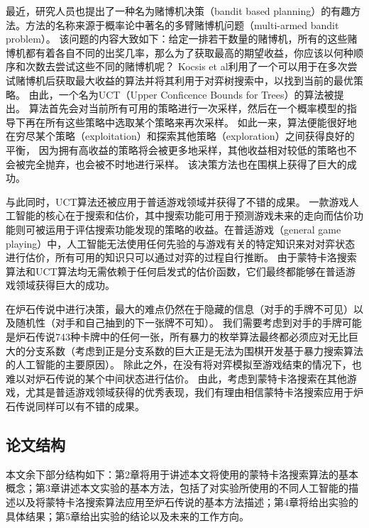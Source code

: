 最近，研究人员也提出了一种名为赌博机决策（bandit based planning）的有趣方法\cite{kocsis2006bandit}。方法的名称来源于概率论中著名的多臂赌博机问题（multi-armed bandit problem）。
该问题的内容大致如下：给定一排若干数量的赌博机，所有的这些赌博机都有着各自不同的出奖几率，那么为了获取最高的期望收益，你应该以何种顺序和次数去尝试这些不同的赌博机呢？
Kocsis et al\cite{kocsis2006bandit}利用了一个可以用于在多次尝试赌博机后获取最大收益的算法并将其利用于对弈树搜索中，以找到当前的最优策略。
由此，一个名为UCT（Upper Conficence Bounds for Trees）的算法被提出。
算法首先会对当前所有可用的策略进行一次采样，然后在一个概率模型的指导下再在所有这些策略中选取某个策略来再次采样。
如此一来，算法便能很好地在穷尽某个策略（exploitation）和探索其他策略（exploration）之间获得良好的平衡，
因为拥有高收益的策略将会被更多地采样，其他收益相对较低的策略也不会被完全抛弃，也会被不时地进行采样。
该决策方法也在围棋上获得了巨大的成功\cite{wang2007modifications,lee2009computational}。

与此同时，UCT算法还被应用于普适游戏领域并获得了不错的成果\cite{finnsson2008simulation}。
一款游戏人工智能的核心在于搜索和估价，其中搜索功能可用于预测游戏未来的走向而估价功能则可被运用于评估搜索功能发现的策略的收益。在普适游戏（general game playing）中，人工智能无法使用任何先验的与游戏有关的特定知识来对对弈状态进行估价，所有可用的知识只可以通过对弈的过程自行推断\cite{clune2007heuristic}。
由于蒙特卡洛搜索算法和UCT算法均无需依赖于任何启发式的估价函数，它们最终都能够在普适游戏领域获得巨大的成功\cite{sharma2008knowledge}。

在炉石传说中进行决策，最大的难点仍然在于隐藏的信息（对手的手牌不可见）以及随机性（对手和自己抽到的下一张牌不可知）。
我们需要考虑到对手的手牌可能是炉石传说743种卡牌中的任何一张，所有暴力的枚举算法最终都必须应对无比巨大的分支系数（考虑到正是分支系数的巨大正是无法为围棋开发基于暴力搜索算法的人工智能的主要原因）。
除此之外，在没有将对弈模拟至游戏结束的情况下，也难以对炉石传说的某个中间状态进行估价。
由此，考虑到蒙特卡洛搜索在其他游戏，尤其是普适游戏领域获得的优秀表现，我们有理由相信蒙特卡洛搜索应用于炉石传说同样可以有不错的成果。

\subsection{论文结构}
\label{section:structure}

本文余下部分结构如下：第2章将用于讲述本文将使用的蒙特卡洛搜索算法的基本概念；第3章讲述本文实验的基本方法，包括了对实验所使用的不同人工智能的描述以及将蒙特卡洛搜索算法应用至炉石传说的基本方法描述；第4章将给出实验的具体结果；第5章给出实验的结论以及未来的工作方向。
